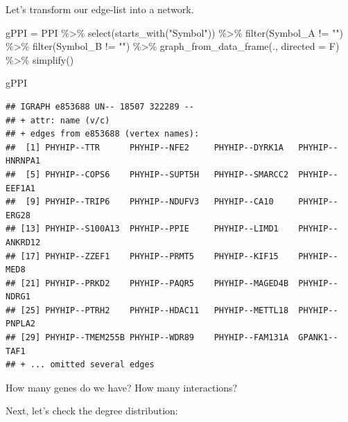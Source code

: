 \documentclass[
]{book}
\newenvironment{Shaded}{\begin{snugshade}}{\end{snugshade}}
\newcommand{\AttributeTok}[1]{\textcolor[rgb]{0.77,0.63,0.00}{#1}}
\newcommand{\FunctionTok}[1]{\textcolor[rgb]{0.00,0.00,0.00}{#1}}
\newcommand{\NormalTok}[1]{#1}
\newcommand{\OtherTok}[1]{\textcolor[rgb]{0.56,0.35,0.01}{#1}}
\newcommand{\SpecialCharTok}[1]{\textcolor[rgb]{0.00,0.00,0.00}{#1}}
\newcommand{\StringTok}[1]{\textcolor[rgb]{0.31,0.60,0.02}{#1}}
\begin{document}
Let's transform our edge-list into a network.

\begin{Shaded}
\begin{Highlighting}[]
\NormalTok{gPPI }\OtherTok{=}\NormalTok{ PPI }\SpecialCharTok{\%\textgreater{}\%} 
  \FunctionTok{select}\NormalTok{(}\FunctionTok{starts\_with}\NormalTok{(}\StringTok{"Symbol"}\NormalTok{)) }\SpecialCharTok{\%\textgreater{}\%}
  \FunctionTok{filter}\NormalTok{(Symbol\_A }\SpecialCharTok{!=} \StringTok{""}\NormalTok{) }\SpecialCharTok{\%\textgreater{}\%}
  \FunctionTok{filter}\NormalTok{(Symbol\_B }\SpecialCharTok{!=} \StringTok{""}\NormalTok{) }\SpecialCharTok{\%\textgreater{}\%}
  \FunctionTok{graph\_from\_data\_frame}\NormalTok{(., }\AttributeTok{directed =}\NormalTok{ F) }\SpecialCharTok{\%\textgreater{}\%}
  \FunctionTok{simplify}\NormalTok{()}

\NormalTok{gPPI}
\end{Highlighting}
\end{Shaded}

\begin{verbatim}
## IGRAPH e853688 UN-- 18507 322289 -- 
## + attr: name (v/c)
## + edges from e853688 (vertex names):
##  [1] PHYHIP--TTR      PHYHIP--NFE2     PHYHIP--DYRK1A   PHYHIP--HNRNPA1 
##  [5] PHYHIP--COPS6    PHYHIP--SUPT5H   PHYHIP--SMARCC2  PHYHIP--EEF1A1  
##  [9] PHYHIP--TRIP6    PHYHIP--NDUFV3   PHYHIP--CA10     PHYHIP--ERG28   
## [13] PHYHIP--S100A13  PHYHIP--PPIE     PHYHIP--LIMD1    PHYHIP--ANKRD12 
## [17] PHYHIP--ZZEF1    PHYHIP--PRMT5    PHYHIP--KIF15    PHYHIP--MED8    
## [21] PHYHIP--PRKD2    PHYHIP--PAQR5    PHYHIP--MAGED4B  PHYHIP--NDRG1   
## [25] PHYHIP--PTRH2    PHYHIP--HDAC11   PHYHIP--METTL18  PHYHIP--PNPLA2  
## [29] PHYHIP--TMEM255B PHYHIP--WDR89    PHYHIP--FAM131A  GPANK1--TAF1    
## + ... omitted several edges
\end{verbatim}

How many genes do we have? How many interactions?

Next, let's check the degree distribution:
\end{document}
